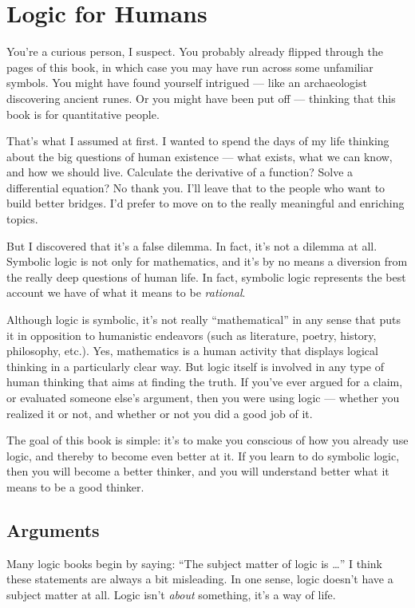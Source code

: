 \chapter{Logic for Humans}

You're a curious person, I suspect.  You probably already flipped
through the pages of this book, in which case you may have run across
some unfamiliar symbols.  You might have found yourself intrigued ---
like an archaeologist discovering ancient runes.  Or you might have
been put off --- thinking that this book is for quantitative people.

That's what I assumed at first.  I wanted to spend the days of my life
thinking about the big questions of human existence --- what exists,
what we can know, and how we should live.  Calculate the derivative of
a function?  Solve a differential equation?  No thank you.  I'll leave
that to the people who want to build better bridges.  I'd prefer to
move on to the really meaningful and enriching topics.

But I discovered that it's a false dilemma.  In fact, it's not a
dilemma at all.  Symbolic logic is not only for mathematics, and it's
by no means a diversion from the really deep questions of human life.
In fact, symbolic logic represents the best account we have of what it
means to be \textit{rational}.

Although logic is symbolic, it's not really ``mathematical'' in any
sense that puts it in opposition to humanistic endeavors (such as
literature, poetry, history, philosophy, etc.).  Yes, mathematics is a
human activity that displays logical thinking in a particularly clear
way.  But logic itself is involved in any type of human thinking that
aims at finding the truth.  If you've ever argued for a claim, or
evaluated someone else's argument, then you were using logic ---
whether you realized it or not, and whether or not you did a good job
of it.

The goal of this book is simple: it's to make you conscious of how you
already use logic, and thereby to become even better at it.  If you
learn to do symbolic logic, then you will become a better thinker, and
you will understand better what it means to be a good thinker.

\section{Arguments}

Many logic books begin by saying: ``The subject matter of logic is
\dots '' I think these statements are always a bit misleading.  In one
sense, logic doesn't have a subject matter at all.  Logic isn't
\textit{about} something, it's a way of life.

